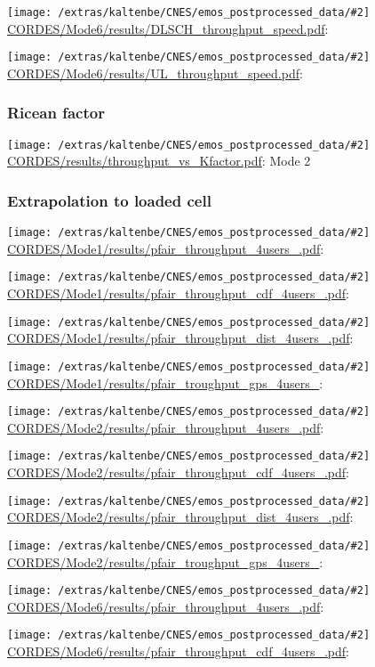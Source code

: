 \documentclass[a4paper,10pt]{article}
\newcommand{\printfile}[2][]{
 \begin{minipage}{8cm}
  \centering
  \texttt{[image: /extras/kaltenbe/CNES/emos\_postprocessed\_data/\#2]}
  \url{#2}: #1

 \end{minipage}
}
\begin{document}
\printfile{CORDES/Mode6/results/DLSCH_throughput_speed.pdf}
\printfile{CORDES/Mode6/results/UL_throughput_speed.pdf}


\subsubsection{Ricean factor}

\printfile[Mode 2]{CORDES/results/throughput_vs_Kfactor.pdf}

\subsubsection{Extrapolation to loaded cell}

\printfile{CORDES/Mode1/results/pfair_throughput_4users_.pdf}
\printfile{CORDES/Mode1/results/pfair_throughput_cdf_4users_.pdf}

\printfile{CORDES/Mode1/results/pfair_throughput_dist_4users_.pdf}
\printfile{CORDES/Mode1/results/pfair_troughput_gps_4users_}

\printfile{CORDES/Mode2/results/pfair_throughput_4users_.pdf}
\printfile{CORDES/Mode2/results/pfair_throughput_cdf_4users_.pdf}

\printfile{CORDES/Mode2/results/pfair_throughput_dist_4users_.pdf}
\printfile{CORDES/Mode2/results/pfair_troughput_gps_4users_}

\printfile{CORDES/Mode6/results/pfair_throughput_4users_.pdf}
\printfile{CORDES/Mode6/results/pfair_throughput_cdf_4users_.pdf}
\end{document}
